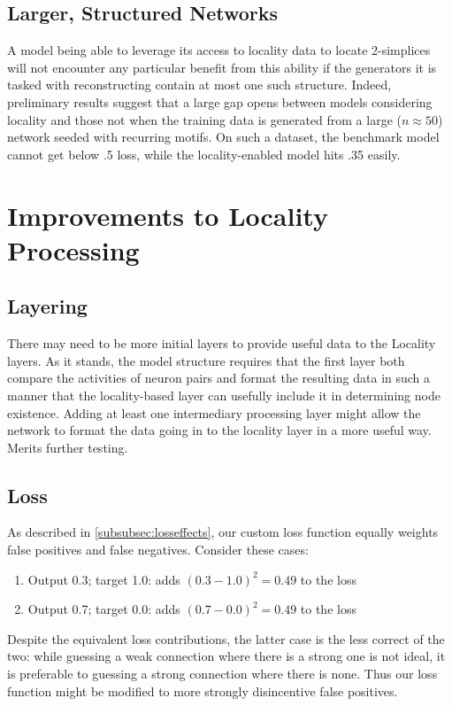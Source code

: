 \subsection{Larger, Structured Networks}
A model being able to leverage its access to locality data to locate 2-simplices 
will not encounter any particular benefit from this ability if the generators it 
is tasked with reconstructing contain at most one such structure. Indeed, 
preliminary results suggest that a large gap opens between models considering 
locality and those not when the training data is generated from a large 
($n\approx50$) network seeded with recurring motifs. On such a dataset, the 
benchmark model cannot get below .5 loss, while the locality-enabled model hits 
.35 easily.

\section{Improvements to Locality Processing}

\subsection{Layering}
There may need to be more initial layers to provide useful data to the Locality 
layers.  As it stands, the model structure requires that the first layer both 
compare the activities of neuron pairs and format the resulting data in such a 
manner that the locality-based layer can usefully include it in determining node 
existence.  Adding at least one intermediary processing layer might allow the 
network to format the data going in to the locality layer in a more useful way.  
Merits further testing.

\subsection{Loss}
\label{subsec:lossdisc}
As described in \ref{subsubsec:losseffects}, our custom loss function equally 
weights false positives and false negatives. Consider these cases:

\begin{enumerate}
	\item Output 0.3; target 1.0: adds $(0.3-1.0)^2=0.49$ to the loss
	\item Output 0.7; target 0.0: adds $(0.7-0.0)^2=0.49$ to the loss
\end{enumerate}
Despite the equivalent loss contributions, the latter case is the less correct 
of the two: while guessing a weak connection where there is a strong one is not 
ideal, it is preferable to guessing a strong connection where there is none.  
Thus our loss function might be modified to more strongly disincentive false 
positives.

